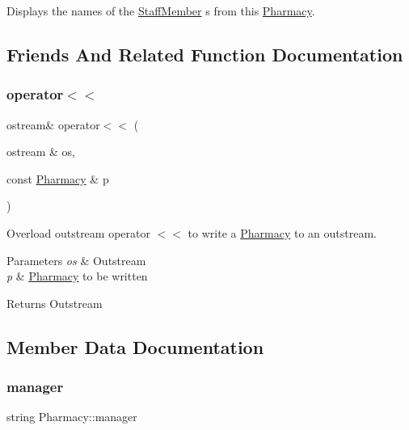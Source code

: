 Displays the names of the \hyperlink{classStaffMember}{Staff\+Member} \textquotesingle{}s from this \hyperlink{classPharmacy}{Pharmacy}. 



\subsection{Friends And Related Function Documentation}
\mbox{\label{classPharmacy_aa75a7da96c11bdada029ebe3ecb397d6}} 
\subsubsection{\texorpdfstring{operator$<$$<$}{operator<<}}
{\footnotesize\ttfamily ostream\& operator$<$$<$ (\begin{DoxyParamCaption}\item[{ostream \&}]{os,  }\item[{const \hyperlink{classPharmacy}{Pharmacy} \&}]{p }\end{DoxyParamCaption})\hspace{0.3cm}{\ttfamily [friend]}}



Overload outstream operator $<$$<$ to write a \hyperlink{classPharmacy}{Pharmacy} to an outstream. 


\begin{DoxyParams}{Parameters}
{\em os} & Outstream\\
\hline
{\em p} & \hyperlink{classPharmacy}{Pharmacy} to be written\\
\hline
\end{DoxyParams}
\begin{DoxyReturn}{Returns}
Outstream 
\end{DoxyReturn}


\subsection{Member Data Documentation}
\mbox{\label{classPharmacy_a620e101128be08b27f4401d53cfc39e6}} 
\subsubsection{\texorpdfstring{manager}{manager}}
{\footnotesize\ttfamily string Pharmacy\+::manager\hspace{0.3cm}{\ttfamily [private]}}

